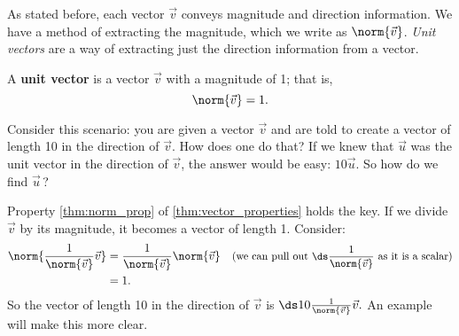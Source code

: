 As stated before, each vector $\vec v$ conveys magnitude and direction information. We have a method of extracting the magnitude, which we write as $\norm{\vec v}$. \emph{Unit vectors} are a way of extracting just the direction information from a vector.

\begin{definition}\label{def:unit_vector}
A \textbf{unit vector} is a vector $\vec v$ with a magnitude of 1; that is, 
\[\norm{\vec v}=1.\]
\end{definition}

Consider this scenario: you are given a vector $\vec v$ and are told to create a vector of length 10 in the direction of $\vec v$. How does one do that? If we knew that $\vec u$ was the unit vector in the direction of $\vec v$, the answer would be easy: $10\vec u$. So how do we find $\vec u$\,?

Property \ref{thm:norm_prop} of \autoref{thm:vector_properties} holds the key. If we divide $\vec v$ by its magnitude, it becomes a vector of length 1. Consider:
\begin{align*}
	\norm{\frac{1}{\norm{\vec v}}\vec v}
	&= \frac{1}{\norm{\vec v}}\norm{\vec v}
	& \text{\small (we can pull out $\ds \frac{1}{\norm{\vec v}}$ as it is a scalar)}\\
	&= 1.
\end{align*}			
So the vector of length 10 in the direction of $\vec v$ is $\ds 10\frac{1}{\norm{\vec v}}\vec v.$ An example will make this more clear.

